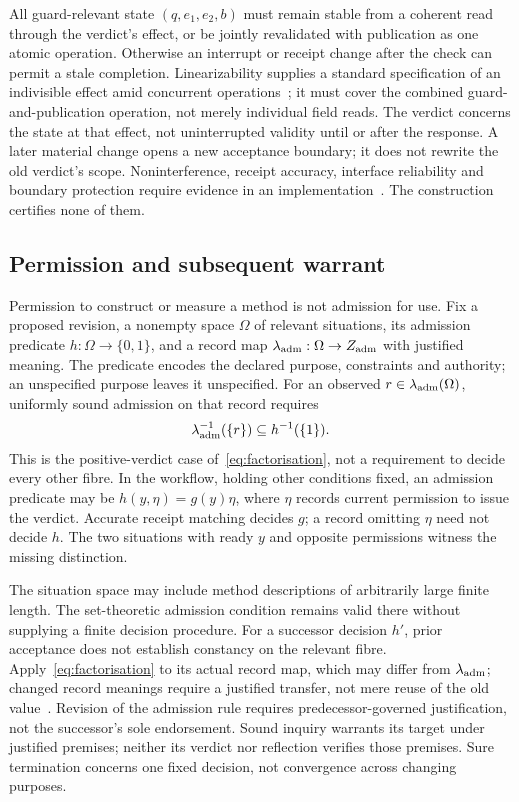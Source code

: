 \documentclass[11pt]{article}
\begin{document}
All guard-relevant state $(q,e_1,e_2,b)$ must remain stable from a coherent read through the verdict's effect, or be jointly revalidated with publication as one atomic operation. Otherwise an interrupt or receipt change after the check can permit a stale completion. Linearizability supplies a standard specification of an indivisible effect amid concurrent operations~\cite{herlihywing}; it must cover the combined guard-and-publication operation, not merely individual field reads. The verdict concerns the state at that effect, not uninterrupted validity until or after the response. A later material change opens a new acceptance boundary; it does not rewrite the old verdict's scope. Noninterference, receipt accuracy, interface reliability and boundary protection require evidence in an implementation~\cite{abadi}. The construction certifies none of them.

\subsection{Permission and subsequent warrant}\label{sec:admission}\label{par:authority}
Permission to construct or measure a method is not admission for use. Fix a proposed revision, a nonempty space $\Omega$ of relevant situations, its admission predicate $h:\Omega\to\{0,1\}$, and a record map $\lambda_{\rm adm}:\Omega\to Z_{\rm adm}$ with justified meaning. The predicate encodes the declared purpose, constraints and authority; an unspecified purpose leaves it unspecified. For an observed $r\in\lambda_{\rm adm}(\Omega)$, uniformly sound admission on that record requires
\begin{equation}\label{eq:admission}
\lambda_{\rm adm}^{-1}(\{r\})\subseteq h^{-1}(\{1\}).
\end{equation}
This is the positive-verdict case of~\eqref{eq:factorisation}, not a requirement to decide every other fibre. In the workflow, holding other conditions fixed, an admission predicate may be $h(y,\eta)=g(y)\eta$, where $\eta$ records current permission to issue the verdict. Accurate receipt matching decides $g$; a record omitting $\eta$ need not decide $h$. The two situations with ready $y$ and opposite permissions witness the missing distinction.

The situation space may include method descriptions of arbitrarily large finite length. The set-theoretic admission condition remains valid there without supplying a finite decision procedure. For a successor decision $h'$, prior acceptance does not establish constancy on the relevant fibre. Apply~\eqref{eq:factorisation} to its actual record map, which may differ from $\lambda_{\rm adm}$; changed record meanings require a justified transfer, not mere reuse of the old value~\cite{cost}. Revision of the admission rule requires predecessor-governed justification, not the successor's sole endorsement. Sound inquiry warrants its target under justified premises; neither its verdict nor reflection verifies those premises. Sure termination concerns one fixed decision, not convergence across changing purposes.
\end{document}
